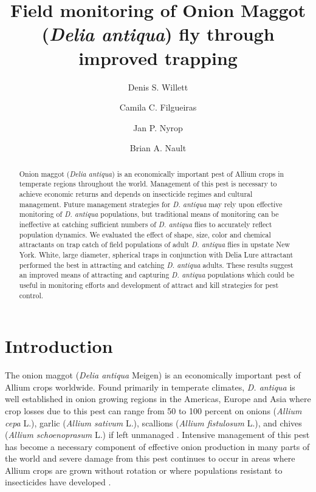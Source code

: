 \documentclass[alpha-refs]{wiley-article}
\title{Field monitoring of Onion Maggot (\textit{Delia antiqua}) fly through improved trapping}
\author[1\authfn{1}]{Denis S. Willett}
\author[1\authfn{1}]{Camila C. Filgueiras}
\author[1]{Jan P. Nyrop}
\author[1]{Brian A. Nault}
\affil[1]{Department of Entomology, Cornell AgriTech, Cornell University, Geneva, NY, 14456, USA}
\begin{document}
\maketitle

\begin{abstract}
Onion maggot (\textit{Delia antiqua}) is an economically important pest of Allium crops in temperate regions throughout the world.  Management of this pest is necessary to achieve economic returns and depends on insecticide regimes and cultural management.  Future management strategies for \textit{D. antiqua} may rely upon effective monitoring of \textit{D. antiqua} populations, but traditional means of monitoring can be ineffective at catching sufficient numbers of \textit{D. antiqua} flies to accurately reflect population dynamics. We evaluated the effect of shape, size, color and chemical attractants on trap catch of field populations of adult \textit{D. antiqua} flies in upstate New York. White, large diameter, spherical traps in conjunction with Delia Lure attractant performed the best in attracting and catching \textit{D. antiqua} adults. These results suggest an improved means of attracting and capturing \textit{D. antiqua} populations which could be useful in monitoring efforts and development of attract and kill strategies for pest control. 

\end{abstract}

\linenumbers
\section{Introduction}

The onion maggot (\textit{Delia antiqua} Meigen) is an economically important pest of Allium crops worldwide.  Found primarily in temperate climates, \textit{D. antiqua} is well established in onion growing regions in the Americas, Europe and Asia where crop losses due to this pest can range from 50 to 100 percent on onions (\textit{Allium cepa} L.), garlic (\textit{Allium sativum} L.), scallions (\textit{Allium fistulosum} L.), and chives (\textit{Allium schoenoprasum} L.) if left unmanaged \citep{ellis1979factors,ning2017predicting,nault2007ecology, nault2006performance, nault2006onion}.  Intensive management of this pest has become a necessary component of effective onion production in many parts of the world and severe damage from this pest continues to occur in areas where Allium crops are grown without rotation or where populations resistant to insecticides have developed \citep{martinson1988dispersal, nault2006onion}.  
\end{document}
